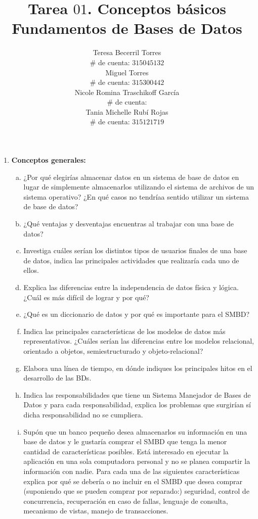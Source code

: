 \documentclass[letterpaper,11pt]{article}
\title{Tarea $01$. Conceptos básicos \\
       Fundamentos de Bases de Datos}
\author{Teresa Becerril Torres \\
        $\#$ de cuenta: $315045132$ \\
        Miguel Torres \\
        $\#$ de cuenta: $315300442$ \\
        Nicole Romina Traschikoff García \\
        $\#$ de cuenta: \\
        Tania Michelle Rubí Rojas \\
        $\#$ de cuenta: $315121719$}
\begin{document}
\maketitle

\begin{enumerate}
    \item \textbf{Conceptos generales:}
    \begin{enumerate}[a. ]
        \item ¿Por qué elegirías almacenar datos en un sistema de base de datos en lugar de simplemente almacenarlos utilizando el sistema de archivos de un sistema operativo? ¿En qué casos no tendríaa sentido utilizar un sistema de base de datos?

        \item ¿Qué ventajas y desventajas encuentras al trabajar con una base de datos?

        \item Investiga cuáles serían los distintos tipos de usuarios finales de una base de datos, indica las principales actividades que realizaría cada uno de ellos.

        \item Explica las diferencias entre la independencia de datos física y lógica. ¿Cuál es más difícil de lograr y por qué?

        \item ¿Qué es un diccionario de datos y por qué es importante para el SMBD?

        \item Indica las principales características de los modelos de datos más representativos. ¿Cuáles serían las diferencias entre los modelos relacional, orientado a objetos, semiestructurado y objeto-relacional?

        \item Elabora una línea de tiempo, en dónde indiques los principales hitos en el desarrollo de las BDs.

        \item Indica las responsabilidades que tiene un Sistema Manejador de Bases de Datos y para cada responsabilidad, explica los problemas que surgirían sí dicha responsabilidad no se cumpliera.

        \item Supón que un banco pequeño desea almacenarlos su información en una base de datos y le gustaría comprar el SMBD que tenga la menor cantidad de características posibles. Está interesado en ejecutar la aplicación en una sola computadora personal y no se planea compartir la información con nadie. Para cada una de las siguientes características explica por qué se debería o no incluir en el SMBD que desea comprar (suponiendo que se pueden comprar por separado:) seguridad, control de concurrencia, recuperación en caso de fallas, lenguaje de consulta, mecanismo de vistas, manejo de transacciones.


\end{enumerate}
\end{enumerate}
\end{document}
